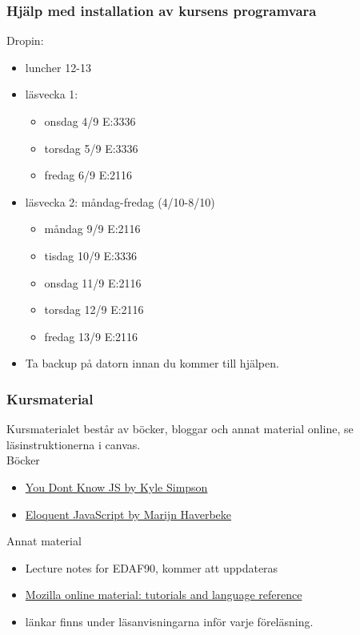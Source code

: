\documentclass[aspectratio=1610]{beamer}
\begin{document}
\begin{frame}
  \frametitle{Hjälp med installation av kursens programvara}
Dropin:
\begin{itemize}
  \item luncher 12-13
  \item läsvecka 1:
  \begin{itemize}
    \item onsdag 4/9 E:3336
    \item torsdag 5/9 E:3336
    \item fredag 6/9 E:2116
  \end{itemize}
  \item läsvecka 2: måndag-fredag (4/10-8/10)
  \begin{itemize}
    \item måndag 9/9 E:2116
    \item tisdag 10/9 E:3336
    \item onsdag 11/9 E:2116
    \item torsdag 12/9 E:2116
    \item fredag 13/9 E:2116
    \end{itemize}
  \item Ta backup på datorn innan du kommer till hjälpen.
\end{itemize}
\end{frame}

\begin{frame}
  \frametitle{Kursmaterial}

Kursmaterialet består av böcker, bloggar och annat material online, se läsinstruktionerna i canvas.
\\ \vspace{3mm}
Böcker
\begin{itemize}
\item \href{https://github.com/getify/You-Dont-Know-JS}{You Dont Know JS by Kyle Simpson} 
\item \href{https://eloquentjavascript.net/}{Eloquent JavaScript by Marijn Haverbeke}
\end{itemize}

Annat material
\begin{itemize}
\item Lecture notes for EDAF90, kommer att uppdateras
\item \href{https://developer.mozilla.org/en-US/docs/Learn}{Mozilla online material: tutorials and language reference}
\item länkar finns under läsanvisningarna inför varje föreläsning.
\end{itemize}

\end{frame}
\end{document}
